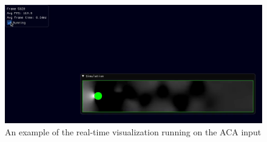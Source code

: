 \begin{figure}[ht]
    \centering
    \centerline{\includegraphics[width=1.25\linewidth]{Ch48Implementation/figures/example_running.png}}
    \caption{An example of the real-time visualization running on the ACA input}
    \label{fig:ExampleRunning}
\end{figure}